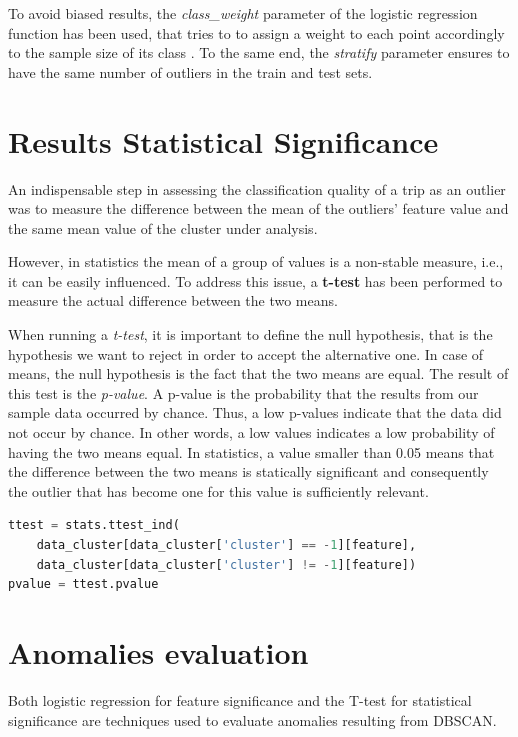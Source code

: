 To avoid biased results, the \textit{class\_weight} parameter of the logistic regression function has been used, that tries to to assign a weight to each point accordingly to the sample size of its class \cite{logistic_regression}. To the same end, the \textit{stratify} parameter ensures to have the same number of outliers in the train and test sets. 

\clearpage
\section{Results Statistical Significance}
\label{sec:significance}

An indispensable step in assessing the classification quality of a trip as an outlier was to measure the difference between the mean of the outliers' feature value and the same mean value of the cluster under analysis.

However, in statistics the mean of a group of values is a non-stable measure, i.e., it can be easily influenced. To address this issue, a \textbf{t-test} has been performed to measure the actual difference between the two means.

When running a \textit{t-test}, it is important to define the null hypothesis, that is the hypothesis we want to reject in order to accept the alternative one. In case of means, the null hypothesis is the fact that the two means are equal. The result of this test is the \textit{p-value}. A p-value is the probability that the results from our sample data occurred by chance. Thus, a low p-values indicate that the data did not occur by chance. In other words, a low values indicates a low probability of having the two means equal. In statistics, a value smaller than 0.05 means that the difference between the two means is statically significant and consequently the outlier that has become one for this value is sufficiently relevant.

\begin{lstlisting}[language=Python]
ttest = stats.ttest_ind(
    data_cluster[data_cluster['cluster'] == -1][feature],
    data_cluster[data_cluster['cluster'] != -1][feature])
pvalue = ttest.pvalue
\end{lstlisting}


\section{Anomalies evaluation}
\label{sec:evaluation}
Both logistic regression for feature significance and the T-test for statistical significance are techniques used to evaluate anomalies resulting from DBSCAN.

